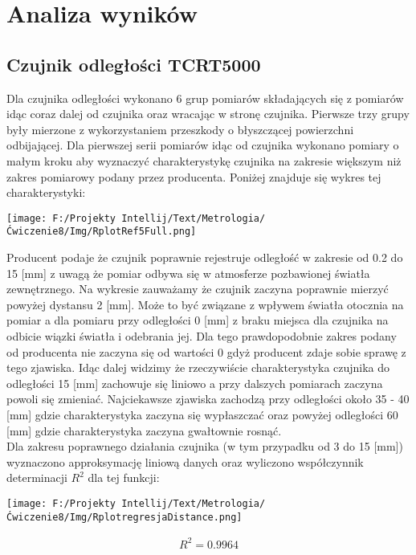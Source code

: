 \documentclass[11pt]{article}
\begin{document}
    \section{Analiza wyników}
    \subsection*{Czujnik odległości TCRT5000}
    Dla czujnika odległości wykonano 6 grup pomiarów składających się z pomiarów idąc coraz dalej od czujnika oraz wracając w stronę czujnika.
    Pierwsze trzy grupy były mierzone z wykorzystaniem przeszkody o błyszczącej powierzchni odbijającej. Dla pierwszej serii pomiarów idąc od czujnika wykonano pomiary o małym
    kroku aby wyznaczyć charakterystykę czujnika na zakresie większym niż zakres pomiarowy podany przez producenta. Poniżej znajduje się wykres tej charakterystyki:
    \begin{center}
        \texttt{[image: F:/Projekty Intellij/Text/Metrologia/Ćwiczenie8/Img/RplotRef5Full.png]}
    \end{center}
    \par Producent podaje że czujnik poprawnie rejestruje odległość w zakresie od 0.2 do 15 [mm] z uwagą że pomiar odbywa się w atmosferze pozbawionej światła zewnętrznego.
    Na wykresie zauważamy że czujnik zaczyna poprawnie mierzyć powyżej dystansu 2 [mm]. Może to być związane z wpływem światła otocznia na pomiar a dla pomiaru przy odległości 0 [mm]
    z braku miejsca dla czujnika na odbicie wiązki światła i odebrania jej. Dla tego prawdopodobnie zakres podany od producenta nie zaczyna się od wartości 0 gdyż producent zdaje sobie
    sprawę z tego zjawiska. Idąc dalej widzimy że
    rzeczywiście charakterystyka czujnika do odległości 15 [mm] zachowuje się liniowo a przy dalszych pomiarach zaczyna powoli się zmieniać. Najciekawsze zjawiska zachodzą przy odległości
    około 35 - 40 [mm] gdzie charakterystyka zaczyna się wypłaszczać oraz powyżej odległości 60 [mm] gdzie charakterystyka zaczyna gwałtownie rosnąć.\\
    \indent Dla zakresu poprawnego działania czujnika (w tym przypadku od 3 do 15 [mm]) wyznaczono approksymację liniową danych oraz wyliczono
    współczynnik determinacji $R^2$ dla tej funkcji:
    \begin{center}
        \texttt{[image: F:/Projekty Intellij/Text/Metrologia/Ćwiczenie8/Img/RplotregresjaDistance.png]}
    \end{center}
    \begin{gather*}
        R^2=0.9964
    \end{gather*}
\end{document}
